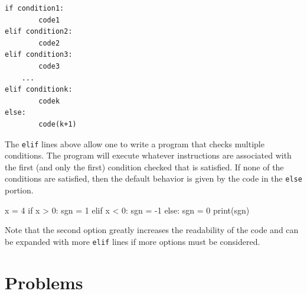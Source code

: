 \documentclass{ximera}
\begin{document}
\begin{verbatim}
if condition1:
        code1
elif condition2:
        code2
elif condition3:
        code3
    ...
elif conditionk:
        codek
else:
        code(k+1)
\end{verbatim}

The \verb|elif| lines above allow one to write a program that checks multiple conditions. The program will execute whatever instructions are associated with the first (and only the first) condition checked that is satisfied. If none of the conditions are satisfied, then the default behavior is given by the code in the \verb|else| portion.

\begin{sageCell}
x = 4
if x > 0:
        sgn = 1
elif x < 0:
        sgn = -1
else:
        sgn = 0
print(sgn)
\end{sageCell}

Note that the second option greatly increases the readability of the code and can be expanded with more \verb|elif| lines if more options must be considered.

\section{Problems}
\end{document}
